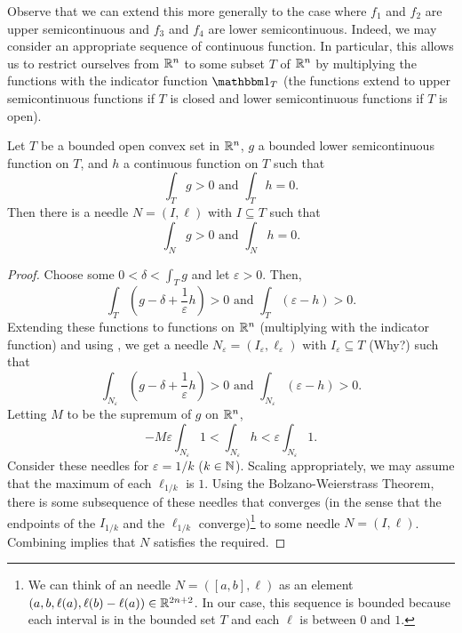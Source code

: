 Observe that we can extend this more generally to the case where $f_1$ and $f_2$ are upper semicontinuous and $f_3$ and $f_4$ are lower semicontinuous. Indeed, we may consider an appropriate sequence of continuous function. In particular, this allows us to restrict ourselves from $\mathbb{R}^n$ to some subset $T$ of $\mathbb{R}^n$ by multiplying the functions with the indicator function $\indic_T$ (the functions extend to upper semicontinuous functions if $T$ is closed and lower semicontinuous functions if $T$ is open).

\begin{corollary}
	Let $T$ be a bounded open convex set in $\mathbb{R}^n$, $g$ a bounded lower semicontinuous function on $T$, and $h$ a continuous function on $T$ such that
	\[ \int_T g > 0 \text{ and } \int_T h = 0. \]
	Then there is a needle $N=(I,\ell)$ with $I\subseteq T$ such that
	\[ \int_N g > 0 \text{ and } \int_N h = 0. \]
\end{corollary}
\begin{proof}
	Choose some $0<\delta<\int_T g$ and let $\varepsilon>0$. Then,
	\[ \int_T \left(g-\delta+\frac{1}{\varepsilon}h\right) > 0 \text{ and } \int_T (\varepsilon-h) > 0. \]
	Extending these functions to functions on $\mathbb{R}^n$ (multiplying with the indicator function) and using , we get a needle $N_\varepsilon=(I_\varepsilon,\ell_\varepsilon)$ with $I_\varepsilon\subseteq T$ (Why?) such that
	\begin{equation}
		\label{eqn: 5.1}
		\int_{N_\varepsilon} \left(g-\delta+\frac{1}{\varepsilon}h\right) > 0 \text{ and } \int_{N_\varepsilon} (\varepsilon-h) > 0.
	\end{equation}
	Letting $M$ to be the supremum of $g$ on $\mathbb{R}^n$,
	\begin{equation}
		\label{eqn: 5.2}
		-M\varepsilon\int_{N_\varepsilon} 1 < \int_{N_\varepsilon} h < \varepsilon \int_{N_\varepsilon} 1.
	\end{equation}
	Consider these needles for $\varepsilon=1/k$ ($k\in\mathbb{N}$). Scaling appropriately, we may assume that the maximum of each $\ell_{1/k}$ is $1$. Using the Bolzano-Weierstrass Theorem, there is some subsequence of these needles that converges (in the sense that the endpoints of the $I_{1/k}$ and the $\ell_{1/k}$ converge)\footnote{We can think of an needle $N=([a,b],\ell)$ as an element $(a,b,\ell(a),\ell(b)-\ell(a))\in\mathbb{R}^{2n+2}$. In our case, this sequence is bounded because each interval is in the bounded set $T$ and each $\ell$ is between $0$ and $1$.} to some needle $N=(I,\ell)$. Combining  implies that $N$ satisfies the required.
\end{proof}

